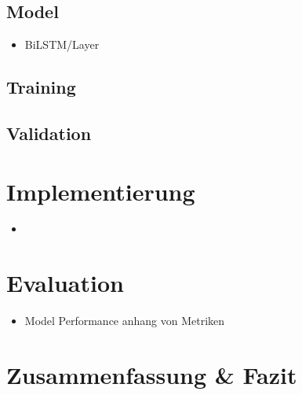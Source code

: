 \documentclass{article}
\begin{document}
    \subsection{Model}
    \begin{itemize}
        \item BiLSTM/Layer
    \end{itemize}
    \subsection{Training}
    \subsection{Validation}

    \section{Implementierung}
    \begin{itemize}
        \item 
    \end{itemize}

    \section{Evaluation}
    \begin{itemize}
        \item Model Performance anhang von Metriken
    \end{itemize}

    \section{Zusammenfassung \& Fazit}

    
    
\end{document}
